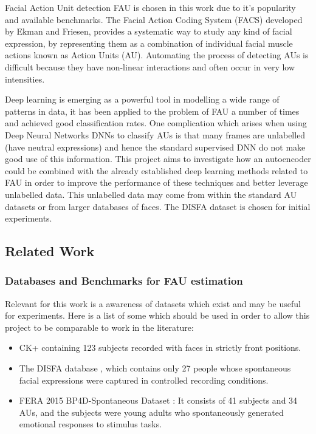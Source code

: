 \documentclass[9pt]{article} \usepackage{amsmath, amsthm, amssymb}
\begin{document}
Facial Action Unit detection FAU \cite{Corneanu2016} is chosen in this work due
to it's popularity and available benchmarks.
The Facial Action Coding System (FACS) developed by Ekman and Friesen,
provides a systematic way to study any kind of facial expression,
by representing them as a combination of individual facial muscle actions
known as Action Units (AU). Automating the process of detecting AUs is difficult
because they have non-linear interactions and often occur in very low intensities.

Deep learning is emerging as a powerful tool in modelling a wide range of patterns
in data, it has been applied to the problem of FAU a number of times and achieved
good classification rates. One complication which arises when using Deep Neural
Networks DNNs to classify AUs is that many frames are unlabelled (have neutral expressions)
and hence the standard supervised DNN do not make good use of this information.
This project aims to investigate how an autoencoder could be combined with the
already established deep learning methods related to FAU in order to improve the performance
of these techniques and better leverage unlabelled data. This unlabelled data may
come from within the standard AU datasets or from larger databases of faces.
The DISFA dataset is chosen for initial experiments.

\subsection{Related Work}

\subsubsection{Databases and Benchmarks for FAU estimation}
Relevant for this work is a awareness of datasets which exist and may be useful
for experiments. Here is a list of some which should be used in order to allow
this project to be comparable to work in the literature:

\begin{itemize}
    \item CK+ \cite{Lucey2010} containing 123 subjects recorded with faces in strictly front positions.
    \item The DISFA database \cite{disfa}, which contains only 27 people whose spontaneous
          facial expressions were captured in controlled recording conditions.
    \item FERA 2015 BP4D-Spontaneous Dataset \cite{Valstar}:
          It consists of 41 subjects and 34 AUs, and the subjects were young adults who
          spontaneously generated emotional responses to stimulus tasks.
\end{itemize}
\end{document}
